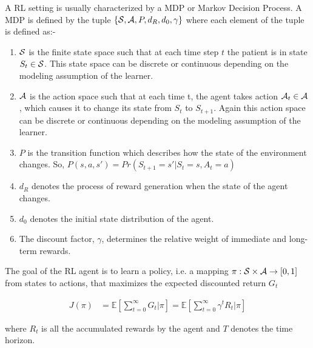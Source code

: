 

A RL setting is usually characterized by a MDP or Markov Decision Process. A MDP is defined by the tuple $\lbrace \S,\A, P, d_R, d_{0},\gamma\rbrace$ where each element of the tuple is defined as:-
\begin{enumerate}
\item $\S$ is the finite state space such that at each time step $t$ the patient is in state $S_t \in \S$. This state space can be discrete or continuous depending on the modeling assumption of the learner.
\item $\A$ is the action space such that at each time t, the agent takes
action $\A_t \in \A$, which causes it to change its state from $S_t$ to $S_{t+1}$. Again this action space can be discrete or continuous depending on the modeling assumption of the learner.
\item $P$ is the transition function which describes how the state of the environment changes. So, $P(s,a,s') = Pr(S_{t+1}=s' | S_{t} = s, A_{t} = a)$
\item $d_R$ denotes the process of reward generation when the state of the agent changes.
\item $d_0$ denotes the initial state distribution of the agent.
\item The discount factor, $\gamma$, determines the relative weight of immediate and long-term rewards. 
\end{enumerate}

The goal of the RL agent is to learn a policy, i.e. a mapping $\pi : \S \times \A \rightarrow [0,1]$  from states to actions, that maximizes the expected discounted return $G_t$

\begin{align*}
J(\pi) &= \mathbb{E}[\sum_{t=0}^{\infty}G_t | \pi] = \mathbb{E}[\sum_{t=0}^{\infty}\gamma^t R_t | \pi]
\end{align*}

where $R_t$ is all the accumulated rewards by the agent and $T$ denotes the time horizon. 

